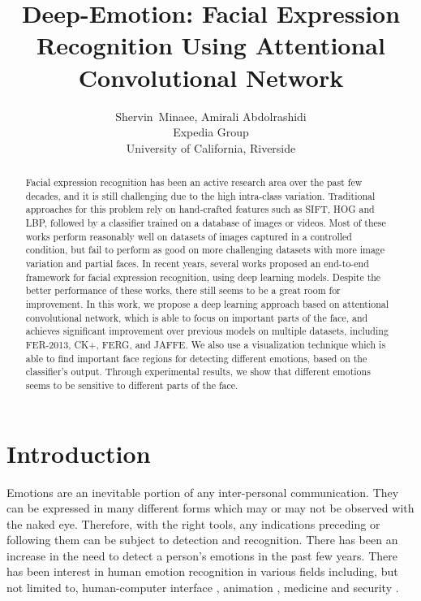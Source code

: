 \documentclass[conference]{IEEEtran}
\begin{document}
\title{Deep-Emotion: Facial Expression Recognition Using Attentional Convolutional Network}


\author{Shervin~Minaee, Amirali Abdolrashidi  \\ Expedia Group \\ University of California, Riverside}


\maketitle


\begin{abstract}
Facial expression recognition has been an active research area over the past few decades, and it is still challenging due to the high intra-class variation. 
   Traditional approaches for this problem rely on hand-crafted features such as SIFT, HOG and LBP, followed by a classifier trained on a database of images or videos. 
   Most of these works perform reasonably well on datasets of images captured in a controlled condition, but fail to perform as good on more challenging datasets with more image variation and partial faces. 
   In recent years, several works proposed an end-to-end framework for facial expression recognition, using deep learning models. 
   Despite the better performance of these works, there still seems to be a great room for improvement.
   In this work, we propose a deep learning approach based on attentional convolutional network, which is able to focus on important parts of the face, and achieves significant improvement over previous models on multiple datasets, including FER-2013, CK+, FERG, and JAFFE.
   We also use a visualization technique which is able to find important face regions for detecting different emotions, based on the classifier's output. 
  Through experimental results, we show that different emotions seems to be sensitive to different parts of the face.
\end{abstract}


\IEEEpeerreviewmaketitle



\section{Introduction}
Emotions are an inevitable portion of any inter-personal communication. They can be expressed in many different forms which may or may not be observed with the naked eye. 
Therefore, with the right tools, any indications preceding or following them can be subject to detection and recognition.
There has been an increase in the need to detect a person's emotions in the past few years. 
There has been interest in human emotion recognition in various fields including, but not limited to, human-computer interface \cite{hci}, animation \cite{aneja2016modeling}, medicine \cite{edwards2002emotion,chu2017facial} and security \cite{clavel2008fear,saste2017emotion}.
\end{document}

